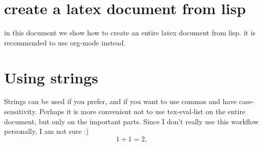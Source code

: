\documentclass{article}
\begin{document}
\section{create a latex document from lisp }

in this document we show how to create an entire latex document from lisp. it is recommended to use org-mode instead. 
 
\section{Using strings}

Strings can be used if you prefer, and if you want to use commas and have 
case-sensitivity. Perhaps it is more convenient not to use tex-eval-list on the entire document, but only on the important parts.
Since I don't really use this workflow personally, I am not sure :) 
\begin{equation}
1+1=2,
\end{equation} 
 
\end{document}
